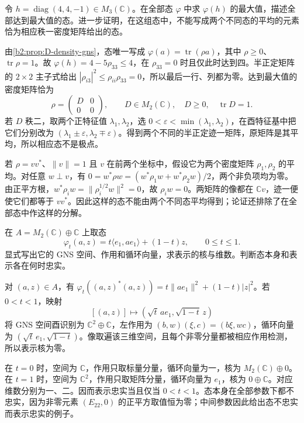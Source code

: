 \begin{exercise}\label{b2:ex:D-density-matrices}
	令 \(h=\operatorname{diag}(4,4,-1)\in M_3(\mathbb C)\)。在全部态 \(\varphi\) 中求 \(\varphi(h)\) 的最大值，描述全部达到最大值的态。进一步证明，在这组态中，不能写成两个不同态的平均的元素恰为相应秩一密度矩阵给出的态。
\end{exercise}
\begin{solution}
	由\cref{b2:prop:D-density-gns}，态唯一写成 \(\varphi(a)=\operatorname{tr}(\rho a)\)，其中 \(\rho\ge0\)、\(\operatorname{tr}\rho=1\)。故 \(\varphi(h)=4-5\rho_{33}\le4\)，在 \(\rho_{33}=0\) 时且仅此时达到四。半正定矩阵的 \(2\times2\) 主子式给出 \(|\rho_{i3}|^2\le\rho_{ii}\rho_{33}=0\)，所以最后一行、列都为零。达到最大值的密度矩阵恰为
	\[
		\rho=\begin{pmatrix}D&0\\0&0\end{pmatrix},
		\qquad D\in M_2(\mathbb C),\quad D\ge0,\quad\operatorname{tr}D=1.
	\]
	若 \(D\) 秩二，取两个正特征值 \(\lambda_1,\lambda_2\)，选 \(0<\varepsilon<\min(\lambda_1,\lambda_2)\)，在酉特征基中把它们分别改为 \((\lambda_1\pm\varepsilon,\lambda_2\mp\varepsilon)\)。得到两个不同的半正定迹一矩阵，原矩阵是其平均，所以相应态不是极点。

	若 \(\rho=vv^*\)、\(\|v\|=1\) 且 \(v\) 在前两个坐标中，假设它为两个密度矩阵 \(\rho_1,\rho_2\) 的平均。对任意 \(w\perp v\)，有 \(0=w^*\rho w=(w^*\rho_1w+w^*\rho_2w)/2\)，两个非负项均为零。由正平方根，\(w^*\rho_iw=\|\rho_i^{1/2}w\|^2=0\)，故 \(\rho_iw=0\)。两矩阵的像都在 \(\mathbb Cv\)，迹一便使它们都等于 \(vv^*\)。因此这样的态不能由两个不同态平均得到；论证还排除了在全部态中作这样的分解。
\end{solution}

\begin{exercise}\label{b2:ex:D-density-gns}
	在 \(A=M_2(\mathbb C)\oplus\mathbb C\) 上取态
	\[
		\varphi_t(a,z)=t\langle e_1,ae_1\rangle+(1-t)z, \qquad0\le t\le1.
	\]
	显式写出它的 GNS 空间、作用和循环向量，求表示的核与维数。判断态本身和表示各在何时忠实。
\end{exercise}
\begin{solution}
	对 \((a,z)\in A\)，有 \(\varphi_t((a,z)^*(a,z))=t\|ae_1\|^2+(1-t)|z|^2\)。若 \(0<t<1\)，映射
	\[
		[(a,z)]\longmapsto(\sqrt t\,ae_1,\sqrt{1-t}\,z)
	\]
	将 GNS 空间酉识别为 \(\mathbb C^2\oplus\mathbb C\)，左作用为 \((b,w)(\xi,c)=(b\xi,wc)\)，循环向量为 \((\sqrt t\,e_1,\sqrt{1-t})\)。像取遍该三维空间，且每个非零分量都被相应作用检测，所以表示核为零。

	在 \(t=0\) 时，空间为 \(\mathbb C\)，作用只取标量分量，循环向量为一，核为 \(M_2(\mathbb C)\oplus0\)。在 \(t=1\) 时，空间为 \(\mathbb C^2\)，作用只取矩阵分量，循环向量为 \(e_1\)，核为 \(0\oplus\mathbb C\)。对应维数分别为一、二。因而表示忠实当且仅当 \(0<t<1\)。态本身在全部参数下都不忠实，因为非零元素 \((E_{22},0)\) 的正平方取值恒为零；中间参数因此给出态不忠实而表示忠实的例子。
\end{solution}

